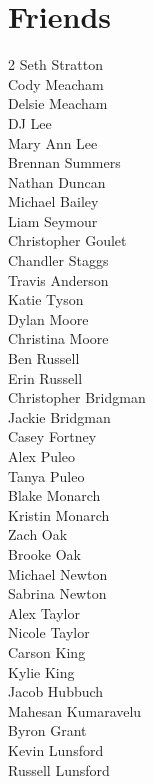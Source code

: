 \section{Friends}
    \centering
    \begin{multicols}{2}
        Seth Stratton \\
        Cody Meacham \\
        Delsie Meacham \\
        DJ Lee \\
        Mary Ann Lee \\
        Brennan Summers \\
        Nathan Duncan \\
        Michael Bailey \\
        Liam Seymour \\
        Christopher Goulet \\
        Chandler Staggs \\
        Travis Anderson \\
        Katie Tyson \\
        Dylan Moore \\
        Christina Moore \\
        Ben Russell \\
        Erin Russell \\
        Christopher Bridgman \\
        Jackie Bridgman \\
        Casey Fortney \\
        Alex Puleo \\
        Tanya Puleo \\
        Blake Monarch \\
        Kristin Monarch \\
        Zach Oak \\
        Brooke Oak \\
        Michael Newton \\
        Sabrina Newton \\
        Alex Taylor \\
        Nicole Taylor \\
        Carson King \\
        Kylie King \\
        Jacob Hubbuch \\
        Mahesan Kumaravelu \\
        Byron Grant \\
        Kevin Lunsford \\
        Russell Lunsford \\

\end{multicols}
